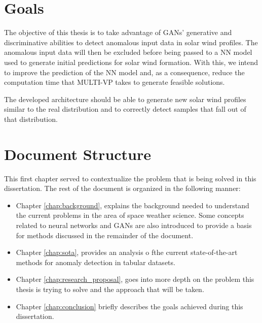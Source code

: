 \section{Goals}\label{sec:goals}
The objective of this thesis is to take advantage of GANs' generative and discriminative abilities to detect anomalous input data in solar wind profiles. The anomalous input data will then be excluded  before being passed to a NN model \cite{barros_InitialConditionEstimation_} used to generate initial predictions for solar wind formation. With this, we intend to improve the prediction of the NN model and, as a consequence, reduce the computation time that MULTI-VP \cite{pinto.rouillard_MultipleFluxtubeSolar_2017} takes to generate feasible solutions.

The developed architecture should be able to generate new solar wind profiles similar to the real distribution and to correctly detect samples that fall out of that distribution.

\section{Document Structure}\label{sec:doc_struct}
This first chapter served to contextualize the problem that is being solved in this dissertation. The rest of the document is organized in the following manner:

\begin{itemize}
    \item Chapter \ref{chap:background}, explains the background needed to understand the current problems in the area of space weather science. Some concepts related to neural networks and GANs are also introduced to provide a basis for methods discussed in the remainder of the document.

    \item Chapter \ref{chap:sota}, provides an analysis o fthe current state-of-the-art methods for anomaly detection in tabular datasets.

    \item Chapter \ref{chap:research_proposal}, goes into more depth on the problem this thesis is trying to solve and the approach that will be taken.

    \item Chapter \ref{chap:conclusion} briefly describes the goals achieved during this dissertation.
\end{itemize}

